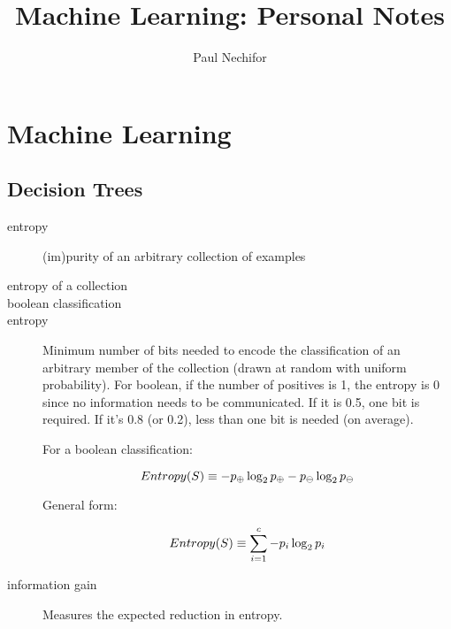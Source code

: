 \documentclass[a4paper, 12pt]{article}
\title{Machine Learning: Personal Notes}
\author{Paul Nechifor}
\begin{document}
\maketitle

\section{Machine Learning}

\subsection{Decision Trees}

\begin{description}

\item[entropy] (im)purity of an arbitrary collection of examples

\item[entropy of a collection]

\item[boolean classification]

\item[entropy] \hfill
Minimum number of bits needed to encode the classification of an arbitrary
member of the collection (drawn at random with uniform probability). For
boolean, if the number of positives is 1, the entropy is 0 since no information
needs to be communicated. If it is 0.5, one bit is required. If it's 0.8 (or
0.2), less than one bit is needed (on average).

For a boolean classification:

\begin{equation}
    Entropy(S) \equiv -p_\oplus \log_2 p_\oplus - p_\ominus \log_2 p_\ominus
    \notag
\end{equation}

General form:

\begin{equation}
    Entropy(S) \equiv \sum\limits_{i=1}^c -p_i \log_2 p_i
    \notag
\end{equation}

\item[information gain] Measures the expected reduction in entropy.

\end{description}
\end{document}
